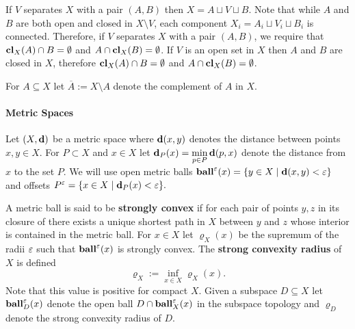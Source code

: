 If $V$ separates $X$ with a pair $(A, B)$ then $X = A\sqcup V\sqcup B$.
Note that while $A$ and $B$ are both open and closed in $X\setminus V$, each component $X_i = A_i\sqcup V_i\sqcup B_i$ is connected.
Therefore, if $V$ separates $X$ with a pair $(A, B)$, we require that $\mathbf{cl}_X(A)\cap B = \emptyset$ and $A\cap \mathbf{cl}_X(B) = \emptyset$.
If $V$ is an open set in $X$ then $A$ and $B$ are closed in $X$, therefore $\mathbf{cl}_X(A)\cap B = \emptyset$ and $A\cap \mathbf{cl}_X(B) = \emptyset$.

For $A\subseteq X$ let $\overline{A} := X\setminus A$ denote the complement of $A$ in $X$.

\paragraph{Metric Spaces}

Let $(X,\mathbf{d})$ be a metric space where $\mathbf{d}(x, y)$ denotes the distance between points $x,y\in X$.
For $P\subset X$ and $x\in X$ let $\mathbf{d}_P(x) = \displaystyle\min_{p\in P}\mathbf{d}(p, x)$ denote the distance from $x$ to the set $P$.
We will use open metric balls $\mathbf{ball}^\varepsilon(x) = \{y\in X\mid \mathbf{d}(x, y) < \varepsilon\}$ and offsets $P^\varepsilon = \{x\in X\mid \mathbf{d}_P(x) < \varepsilon\}.$

A metric ball is said to be \textbf{strongly convex} if for each pair of points $y,z$ in its closure of there exists a unique shortest path in $X$ between $y$ and $z$ whose interior is contained in the metric ball.
For $x\in X$ let $\varrho_X(x)$ be the supremum of the radii $\varepsilon$ such that $\mathbf{ball}^\varepsilon(x)$ is strongly convex.
The \textbf{strong convexity radius} of $X$ is defined
\[ \varrho_X := \inf_{x\in X} \varrho_X(x).\]
Note that this value is positive for compact $X$.
Given a subspace $D\subseteq X$ let $\mathbf{ball}_D^\varepsilon(x)$ denote the open ball $D\cap \mathbf{ball}_X^\varepsilon(x)$ in the subspace topology and $\varrho_D$ denote the strong convexity radius of $D$.
